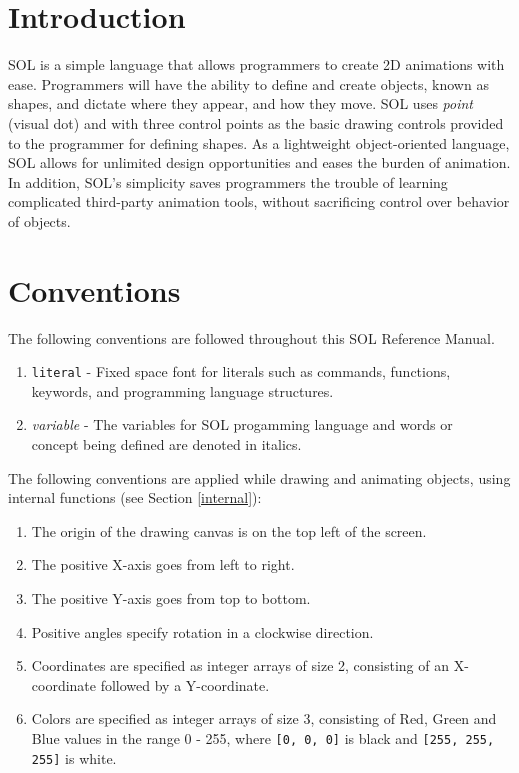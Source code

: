 
\section{Introduction}
SOL is a simple language that allows programmers to create 2D animations with ease. Programmers will have the ability to define and create objects, known as shapes, and dictate where they appear, and how they move. SOL uses \textit{point} (visual dot) and  with three control points as the basic drawing controls provided to the programmer for defining shapes. As a lightweight object-oriented language, SOL allows for unlimited design opportunities and eases the burden of animation. In addition, SOL’s simplicity saves programmers the trouble of learning complicated third-party animation tools, without sacrificing control over behavior of objects.
\par

\section{Conventions}
    The following conventions are followed throughout this SOL Reference Manual.

    \begin{enumerate}
        \itemsep0em
        \item \texttt{literal} - Fixed space font for literals such as commands, functions,\\
        \hspace*{4.4em} keywords, and programming language structures.
        
        \item \textit{variable} - The variables for SOL progamming language and words or\\
        \hspace*{4.4em} concept being defined are denoted in italics.
    \end{enumerate}

    The following conventions are applied while drawing and animating objects, using internal functions (see Section \ref{internal}):

    \begin{enumerate}
        \itemsep0em
        \item The origin of the drawing canvas is on the top left of the screen.
        \item The positive X-axis goes from left to right.
        \item The positive Y-axis goes from top to bottom.
        \item Positive angles specify rotation in a clockwise direction.
        \item Coordinates are specified as integer arrays of size 2, consisting of an X-coordinate followed by a Y-coordinate.
        \item Colors are specified as integer arrays of size 3, consisting of Red, Green and Blue values in the range 0 - 255, where \texttt{[0, 0, 0]} is black and \texttt{[255, 255, 255]} is white.
    \end{enumerate}

